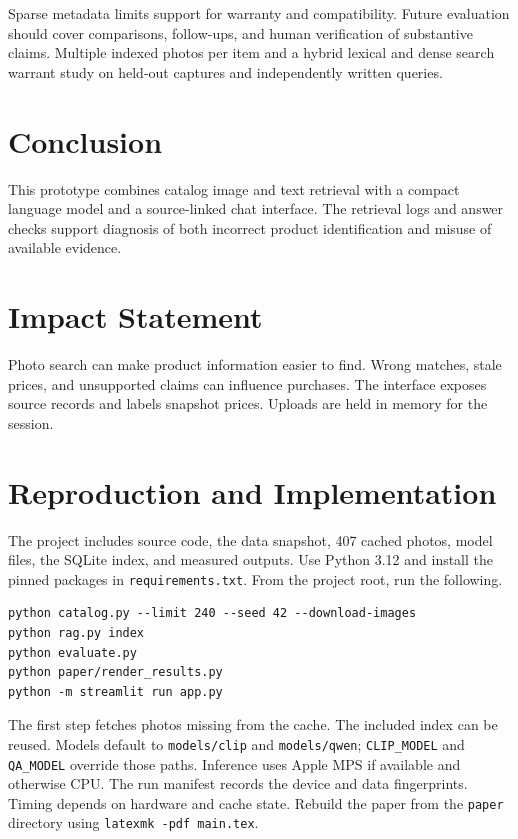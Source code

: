 \documentclass{article}
\begin{document}
Sparse metadata limits support for warranty and compatibility. Future evaluation should cover comparisons, follow-ups, and human verification of substantive claims. Multiple indexed photos per item and a hybrid lexical and dense search warrant study on held-out captures and independently written queries.

\section{Conclusion}
This prototype combines catalog image and text retrieval with a compact language model and a source-linked chat interface. \ConclusionResults{} The retrieval logs and answer checks support diagnosis of both incorrect product identification and misuse of available evidence.

\section*{Impact Statement}
Photo search can make product information easier to find. Wrong matches, stale prices, and unsupported claims can influence purchases. The interface exposes source records and labels snapshot prices. Uploads are held in memory for the session.




\clearpage
\onecolumn
\appendix
\section{Reproduction and Implementation}
The project includes source code, the data snapshot, 407 cached photos, model files, the SQLite index, and measured outputs. Use Python 3.12 and install the pinned packages in \texttt{requirements.txt}. From the project root, run the following.
\begin{verbatim}
python catalog.py --limit 240 --seed 42 --download-images
python rag.py index
python evaluate.py
python paper/render_results.py
python -m streamlit run app.py
\end{verbatim}
The first step fetches photos missing from the cache. The included index can be reused. Models default to \texttt{models/clip} and \texttt{models/qwen}; \texttt{CLIP\_MODEL} and \texttt{QA\_MODEL} override those paths. Inference uses Apple MPS if available and otherwise CPU. The run manifest records the device and data fingerprints. Timing depends on hardware and cache state. Rebuild the paper from the \texttt{paper} directory using \texttt{latexmk -pdf main.tex}.
\end{document}
